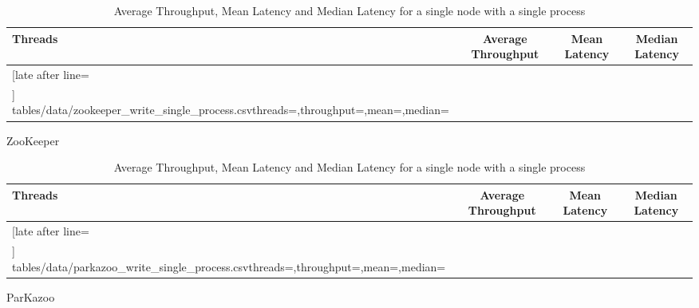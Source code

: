 \begin{table}[ht!]
	\begin{subtable}[t]{1.0\linewidth}
		\centering
		\begin{tabular}{|l|c|c|c|}\hline%
			\textbf{Threads} & \textbf{Average Throughput} & \textbf{Mean Latency} & \textbf{Median Latency} \\\hline
			\csvreader[late after line=\\\hline]%
			{tables/data/zookeeper_write_single_process.csv}{threads=\threads,throughput=\throughput,mean=\mean,median=\median}%
			{\threads & \throughput & \mean & \median}%
		\end{tabular}
		\caption{ZooKeeper}
		\label{tab:zookeeper_single_process_write_throughput}
	\end{subtable}
	\begin{subtable}[t]{1.0\linewidth}
		\centering
		\begin{tabular}{|l|c|c|c|}\hline%
			\textbf{Threads} & \textbf{Average Throughput} & \textbf{Mean Latency} & \textbf{Median Latency} \\\hline
			\csvreader[late after line=\\\hline]%
			{tables/data/parkazoo_write_single_process.csv}{threads=\threads,throughput=\throughput,mean=\mean,median=\median}%
			{\threads & \throughput & \mean & \median}%
		\end{tabular}
		\caption{ParKazoo}
		\label{tab:parkazoo_single_process_write_throughput}
	\end{subtable}
	\caption{Average Throughput, Mean Latency and Median Latency for a single node with a single process}
	\label{table:single_process_write_throughput}
\end{table}

